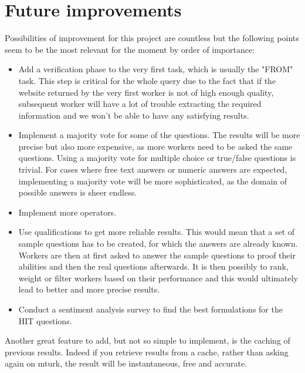 \documentclass{article}
\begin{document}
\section{Future improvements} %
Possibilities of improvement for this project are countless but the following points seem to be the most relevant for the moment by order of importance:
\begin{itemize}
\item Add a verification phase to the very first task, which is usually the "FROM" task. This step is critical for the whole query due to the fact that if the website returned by the very first worker is not of high enough quality, subsequent worker will have a lot of trouble extracting the required information and we won't be able to have any satisfying results.
\item Implement a majority vote for some of the questions. The results will be more precise but also more expensive, as more workers need to be asked the same questions. Using a majority vote for multiple choice or true/false questions is trivial. For cases where free text answers or numeric answers are expected, implementing a majority vote will be more sophisticated, as the domain of possible answers is sheer endless.
\item Implement more operators.
\item Use qualifications to get more reliable results. This would mean that a set of sample questions has to be created, for which the answers are already known. Workers are then at first asked to answer the sample questions to proof their abilities and then the real questions afterwards. It is then possibly to rank, weight or filter workers based on their performance and this would ultimately lead to better and more precise results.
\item Conduct a sentiment analysis survey to find the best formulations for the HIT questions.

\end{itemize}
Another great feature to add, but not so simple to implement, is the caching of previous results. Indeed if you retrieve results from a cache, rather than asking again on mturk, the result will be instantaneous, free and accurate.
\end{document}
